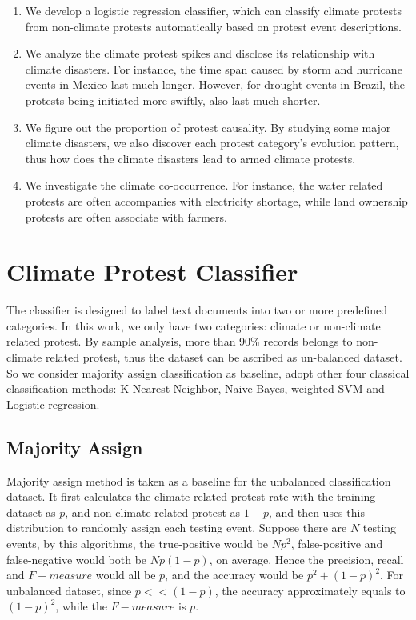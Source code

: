 \begin{enumerate}
  \item We develop a logistic regression classifier, which can classify climate protests from non-climate protests automatically based on protest event descriptions.
  \item We analyze the climate protest spikes and disclose its relationship with climate disasters. For instance, the time span caused by storm and hurricane events in Mexico last much longer. However, for drought events in Brazil, the protests being initiated more swiftly, also last much shorter.
  \item We figure out the proportion of protest causality. By studying some major climate disasters, we also discover each protest category's evolution pattern, thus how does the climate disasters lead to armed climate protests.
  \item We investigate the climate co-occurrence. For instance, the water related protests are often accompanies with electricity shortage, while land ownership protests are often associate with farmers.
\end{enumerate}
%

\section{Climate Protest Classifier}
The classifier is designed to label text documents into two or more predefined categories. In this work, we only have two categories: climate or non-climate related protest. By sample analysis, more than 90\% records belongs to non-climate related protest, thus the dataset can be ascribed as un-balanced dataset. So we consider majority assign classification as baseline, adopt other four classical classification methods: K-Nearest Neighbor, Naive Bayes, weighted SVM and Logistic regression.

\subsection{Majority Assign}
Majority assign method is taken as a baseline for the unbalanced classification dataset. It first calculates the climate related protest rate with the training dataset as $p$, and non-climate related protest as $1-p$, and then uses this distribution to randomly assign each testing event. Suppose there are $N$ testing events, by this algorithms, the true-positive would be $Np^2$, false-positive and false-negative would both be $Np(1-p)$, on average. Hence the precision, recall and $F-measure$ would all be $p$, and the accuracy would be $p^2+(1-p)^2$. For unbalanced dataset, since $p<<(1-p)$, the accuracy approximately equals to $(1-p)^2$, while the $F-measure$ is $p$.

